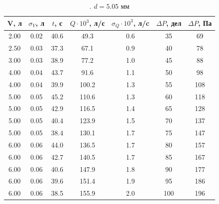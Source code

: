 \documentclass[a4paper]{article}
\begin{document}
\begin{itemize}
\begin{table}[]
\centering
\begin{tabular}{|c|c|c|c|c|c|c|}
\hline
V, л & $\sigma_{V}$, л & $t$, с & $Q \cdot 10^{3}$, л/с & $\sigma_Q \cdot 10^{3}$, л/c & $\Delta P$, дел             & $\Delta P$, Па              \\ \hline
2.00 & 0.02            & 40.6   & 49.3                  & 0.6             & \cellcolor[HTML]{00FF00}35  & \cellcolor[HTML]{00FF00}69  \\ \hline
2.50 & 0.03            & 37.3   & 67.1                  & 0.9             & \cellcolor[HTML]{00FF00}40  & \cellcolor[HTML]{00FF00}78  \\ \hline
3.00 & 0.03            & 38.9   & 77.2                  & 1.0             & \cellcolor[HTML]{00FF00}45  & \cellcolor[HTML]{00FF00}88  \\ \hline
4.00 & 0.04            & 43.7   & 91.6                  & 1.1             & \cellcolor[HTML]{00FF00}50  & \cellcolor[HTML]{00FF00}98  \\ \hline
4.00 & 0.04            & 39.9   & 100.2                 & 1.3             & \cellcolor[HTML]{00FF00}55  & \cellcolor[HTML]{00FF00}108 \\ \hline
5.00 & 0.05            & 45.2   & 110.6                 & 1.3             & \cellcolor[HTML]{00FF00}60  & \cellcolor[HTML]{00FF00}118 \\ \hline
5.00 & 0.05            & 42.9   & 116.5                 & 1.4             & \cellcolor[HTML]{00FF00}65  & \cellcolor[HTML]{00FF00}128 \\ \hline
5.00 & 0.05            & 40.4   & 123.9                 & 1.5             & \cellcolor[HTML]{FF0000}70  & \cellcolor[HTML]{FF0000}137 \\ \hline
5.00 & 0.05            & 38.4   & 130.1                 & 1.7             & \cellcolor[HTML]{FF0000}75  & \cellcolor[HTML]{FF0000}147 \\ \hline
6.00 & 0.06            & 44.0   & 136.5                 & 1.7             & \cellcolor[HTML]{FF0000}80  & \cellcolor[HTML]{FF0000}157 \\ \hline
6.00 & 0.06            & 42.7   & 140.5                 & 1.7             & \cellcolor[HTML]{FF0000}85  & \cellcolor[HTML]{FF0000}167 \\ \hline
6.00 & 0.06            & 40.6   & 147.9                 & 1.8             & \cellcolor[HTML]{FF0000}90  & \cellcolor[HTML]{FF0000}177 \\ \hline
6.00 & 0.06            & 39.6   & 151.4                 & 1.9             & \cellcolor[HTML]{FF0000}95  & \cellcolor[HTML]{FF0000}186 \\ \hline
6.00 & 0.06            & 38.5   & 155.9                 & 2.0             & \cellcolor[HTML]{FF0000}100 & \cellcolor[HTML]{FF0000}196 \\ \hline
\end{tabular}
\caption{. $d = 5.05$ мм}
\end{table}


\end{itemize}
\end{document}
